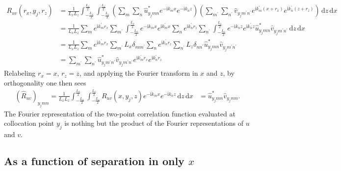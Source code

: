 \documentclass[letterpaper,11pt,nointlimits,reqno]{amsart}
\newcommand{\ii}{\ensuremath{\mathrm{i}}}
\begin{document}
\begin{align}
R_{uv} \left( r_x, y_j, r_z \right)
  &= \frac{1}{L_x L_z}
     \int_{-\frac{L_x}{2}}^{\frac{L_x}{2}}
     \int_{-\frac{L_z}{2}}^{\frac{L_z}{2}}
        \left(
         \sum_{m}\sum_{n}
         \hat{u}^\ast_{y_j m n}
         e^{-\ii k_m x}e^{-\ii k_n z}
       \right)
       \left(
         \sum_{m^\prime}\sum_{n^\prime}
         \hat{v}_{y_j m^\prime n^\prime}
         e^{\ii k_m^\prime \left(x+r_x\right)}e^{\ii k_n^\prime \left(z+r_z\right)}
       \right)
     \,\mathrm{d}z
     \,\mathrm{d}x
\\
  &= \frac{1}{L_x L_z}
     \sum_{m}
     e^{\ii k_m^\prime r_x}
     \sum_{m^\prime}
     \int_{-\frac{L_x}{2}}^{\frac{L_x}{2}}
     e^{-\ii k_m x} e^{\ii k_m^\prime x}
     \sum_{n}
     e^{\ii k_n^\prime r_z}
     \sum_{n^\prime}
     \int_{-\frac{L_z}{2}}^{\frac{L_z}{2}}
     e^{-\ii k_n z} e^{\ii k_n^\prime z}
     \hat{u}^\ast_{y_j m n}
     \hat{v}_{y_j m^\prime n^\prime}
     \,\mathrm{d}z
     \,\mathrm{d}x
\\
  &= \frac{1}{L_x L_z}
     \sum_{m}
     e^{\ii k_m^\prime r_x}
     \sum_{m^\prime}
     L_x \delta_{m m^\prime}
     \sum_{n}
     e^{\ii k_n^\prime r_z}
     \sum_{n^\prime}
     L_z \delta_{n n^\prime}
     \hat{u}^\ast_{y_j m n}
     \hat{v}_{y_j m^\prime n^\prime}
\\
  &= \sum_{m^\prime}
     \sum_{n^\prime}
     \hat{u}^\ast_{y_j m^\prime n^\prime}
     \hat{v}_{y_j m^\prime n^\prime}
     e^{\ii k_m^\prime r_x}
     e^{\ii k_n^\prime r_z}
    \label{eq:twopointxz_physical}
\end{align}
Relabeling $r_x = x$, $r_z = z$, and applying the Fourier transform in $x$ and
$z$, by orthogonality one then sees
\begin{align}
\left(\hat{R}_{uv}\right)_{y_j m n}
    =
    \frac{1}{L_x L_z}
    \int_{-\frac{L_x}{2}}^{\frac{L_x}{2}}
    \int_{-\frac{L_z}{2}}^{\frac{L_z}{2}}
    R_{uv} \left( x, y_j, z \right)
    e^{-\ii k_m x}
    e^{-\ii k_n z}
    \,\mathrm{d}z
    \,\mathrm{d}x
    &=
    \hat{u}^\ast_{y_j m n}
    \hat{v}_{y_j m n}.
    \label{eq:twopointxz_wave}
\end{align}
The Fourier representation of the two-point correlation function evaluated at
collocation point $y_j$ is nothing but the product of the Fourier
representations of $u$ and $v$.

\subsection{As a function of separation in only $x$}
\end{document}
